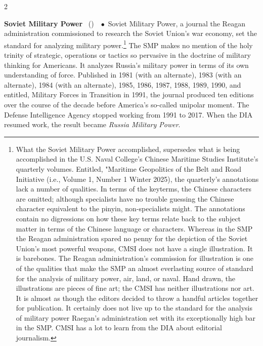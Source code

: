 \documentclass[10pt,a4paper,twoside]{article} %
\newcommand{\entry}[4]{\markboth{#1}{#1}\textbf{#1}\ {(#2)}\ \textit{#3}\ $\bullet$\ {#4}}  %
\begin{document}
\begin{multicols}{2}
{\entry{Soviet Military Power } {} {} {Soviet Military Power, a journal the Reagan administration commissioned to research the Soviet Union's war economy, set the standard for analyzing military power.\footnote{What the Soviet Military Power accomplished, supersedes what is being accomplished in the U.S. Naval College's Chinese Maritime Studies Institute's quarterly volumes. Entitled, "Maritime Geopolitics of the Belt and Road Initiative (i.e., Volume 1, Number 1 Winter 2025), the quarterly's annotations lack a number of qualities. In terms of the keyterms, the Chinese characters are omitted; although specialists have no trouble guessing the Chinese character equivalent to the pinyin, non-specialists might. The annotations contain no digressions on how these key terms relate back to the subject matter in terms of the Chinese language or characters. Whereas in the SMP the Reagan administration spared no penny for the depiction of the Soviet Union's most powerful weapons, CMSI does not have a single illustration. It is barebones. The Reagan administration's commission for illustration is one of the qualities that make the SMP an almost everlasting source of standard for the analysis of military power, air, land, or naval. Hand drawn, the illustrations are pieces of fine art; the CMSI has neither illustrations nor art. It is almost as though the editors decided to throw a handful articles together for publication. It certainly does not live up to the standard for the analysis of military power Raegan's administration set with its exceptionally high bar in the SMP. CMSI has a lot to learn from the DIA about editorial journalism.}  The SMP makes no mention of the holy trinity of strategic, operations or tactics so pervasive in the doctrine of military thinking for Americans. It analyzes Russia's military power in terms of its own understanding of force. Published in 1981 (with an alternate), 1983 (with an alternate), 1984 (with an alternate), 1985, 1986, 1987, 1988, 1989, 1990, and entitled, Military Forces in Transition in 1991, the journal produced ten editions over the course of the decade before America's so-called unipolar moment. The Defense Intelligence Agency stopped working from 1991 to 2017. When the DIA resumed work, the result became \emph{Russia Military Power}. 
}

}
\end{multicols}
\end{document}
